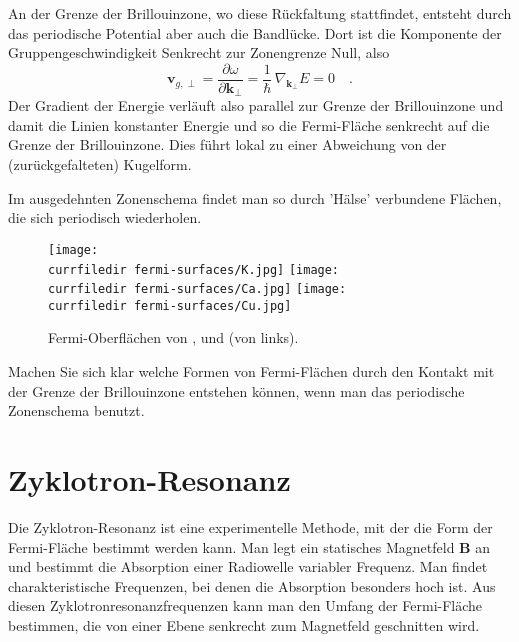 An der Grenze der Brillouinzone, wo diese Rückfaltung stattfindet, entsteht durch das periodische Potential aber auch die Bandlücke. Dort ist die Komponente der Gruppengeschwindigkeit Senkrecht zur Zonengrenze Null, also 
\begin{equation}
 \mathbf{v}_{g,\perp} = \frac{\partial \omega}{\partial \mathbf{k}_\perp} = \frac{1}{\hbar} \, \nabla_{\mathbf{k}_\perp} E = 0  \quad .
\end{equation}
Der Gradient der Energie verläuft also parallel zur Grenze der Brillouinzone und damit die Linien konstanter Energie und so die Fermi-Fläche senkrecht auf die Grenze der Brillouinzone. Dies führt lokal zu einer Abweichung von der (zurückgefalteten) Kugelform. 

Im ausgedehnten Zonenschema findet man so durch 'Hälse' verbundene Flächen, die sich periodisch wiederholen.


\begin{figure}
   \texttt{[image: \\currfiledir fermi-surfaces/K.jpg]}
  \hspace*{1mm}
   \texttt{[image: \\currfiledir fermi-surfaces/Ca.jpg]}
   \hspace*{1mm}
   \texttt{[image: \\currfiledir fermi-surfaces/Cu.jpg]}

   \caption{Fermi-Oberflächen von ,  und  (von links). \cite{Choy00_fermi_surfaces} }
   \label{fig:4_fermi_surfaces}
\end{figure}
    

\begin{questions}
   \item Machen Sie sich klar welche Formen von Fermi-Flächen durch den Kontakt mit der Grenze der Brillouinzone entstehen können, wenn man das periodische Zonenschema benutzt.
\end{questions}

\section{Zyklotron-Resonanz}

Die Zyklotron-Resonanz ist eine experimentelle Methode, mit der die Form der Fermi-Fläche bestimmt werden kann. Man legt ein statisches Magnetfeld $\mathbf{B}$ an und bestimmt die Absorption einer Radiowelle variabler Frequenz. Man findet charakteristische Frequenzen, bei denen die Absorption besonders hoch ist. Aus diesen Zyklotronresonanzfrequenzen kann man den Umfang der Fermi-Fläche bestimmen, die von einer Ebene senkrecht zum Magnetfeld geschnitten wird.


